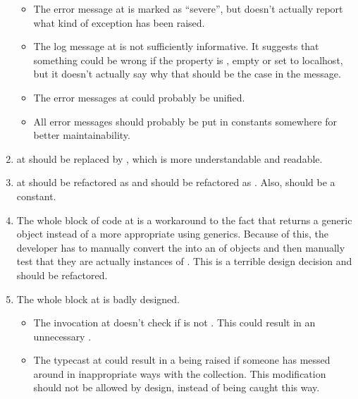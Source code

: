 \begin{enumerate}
\begin{itemize}
			\item The error message at  is marked as “severe”, but doesn't actually report what kind of exception has been raised. 
			\item The log message at  is not sufficiently informative. It suggests that something could be wrong if the  property is , empty or set to localhost, but it doesn't actually say why that should be the case in the message. 
			\item The error messages at  could probably be unified. 
			\item All error messages should probably be put in constants somewhere for better maintainability. 
		\end{itemize}
	\item {}  at  should be replaced by , which is more understandable and readable.
	\item {}  at  should be refactored as  and  should be refactored as . Also,  should be a constant.
	\item {} The whole block of code at  is a workaround to the fact that  returns a generic  object instead of a more appropriate  using generics. Because of this, the developer has to manually convert the  into an  of  objects and then manually test that they are actually instances of . This is a terrible design decision and should be refactored.
	\item {} The whole  block at  is badly designed. 
		\begin{itemize}
			\item The invocation  at  doesn't check if  is not . This could result in an unnecessary . 
			\item The typecast at  could result in a  being raised if someone has messed around in inappropriate ways with the  collection. This modification should not be allowed by design, instead of being caught this way. 

\end{itemize}
\end{enumerate}
